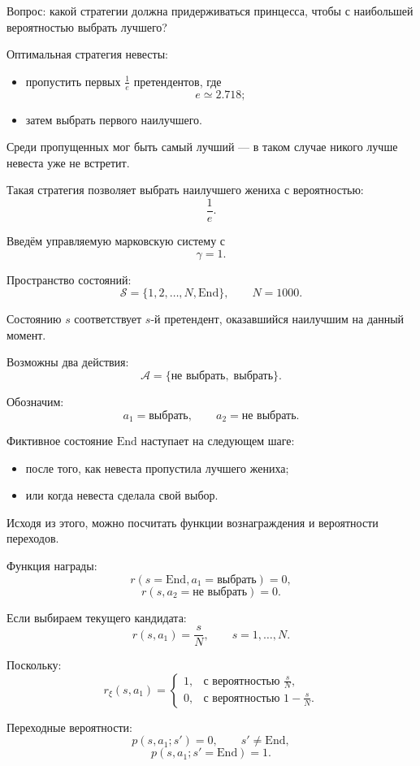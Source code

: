 \documentclass[12pt,a4paper]{article}
\begin{document}
Вопрос: какой стратегии должна придерживаться принцесса, чтобы с наибольшей вероятностью выбрать лучшего?

Оптимальная стратегия невесты:
\begin{itemize}
    \item пропустить первых $\frac{1}{e}$ претендентов, где
    \[
    e \simeq 2.718;
    \]
    \item затем выбрать первого наилучшего.
\end{itemize}

Среди пропущенных мог быть самый лучший --- в таком случае никого лучше невеста уже не встретит.

Такая стратегия позволяет выбрать наилучшего жениха с вероятностью:
\[
\frac{1}{e}.
\]

Введём управляемую марковскую систему с
\[
\gamma = 1.
\]

Пространство состояний:
\[
\mathcal S = \{1,2,\ldots,N,\mathrm{End}\},
\qquad
N=1000.
\]

Состоянию $s$ соответствует $s$-й претендент, оказавшийся наилучшим на данный момент.

Возможны два действия:
\[
\mathcal A = \{\text{не выбрать},\; \text{выбрать}\}.
\]

Обозначим:
\[
a_1 = \text{выбрать},
\qquad
a_2 = \text{не выбрать}.
\]

Фиктивное состояние $\mathrm{End}$ наступает на следующем шаге:
\begin{itemize}
    \item после того, как невеста пропустила лучшего жениха;
    \item или когда невеста сделала свой выбор.
\end{itemize}

Исходя из этого, можно посчитать функции вознаграждения и вероятности переходов.

Функция награды:
\[
r(s=\mathrm{End},a_1=\text{выбрать})=0,
\]
\[
r(s,a_2=\text{не выбрать})=0.
\]

Если выбираем текущего кандидата:
\[
r(s,a_1)=\frac{s}{N},
\qquad
s=1,\ldots,N.
\]

Поскольку:
\[
r_\xi(s,a_1)
=
\begin{cases}
1, & \text{с вероятностью } \frac{s}{N},\\
0, & \text{с вероятностью } 1-\frac{s}{N}.
\end{cases}
\]

Переходные вероятности:
\[
p(s,a_1;s')=0,
\qquad
s' \ne \mathrm{End},
\]
\[
p(s,a_1;s'=\mathrm{End})=1.
\]
\end{document}
